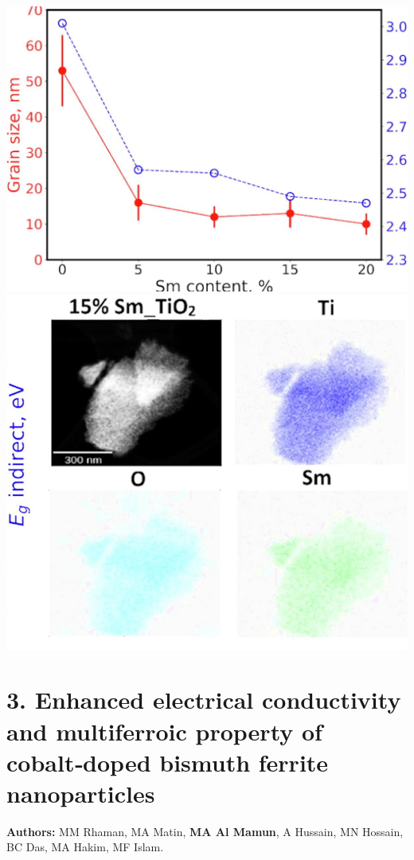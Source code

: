 \documentclass[a4paper,20pt]{article}
\begin{document}
    \begin{minipage}{0.4\linewidth}\begin{flushright}
    	 	\includegraphics[width=0.80\linewidth]{AppSurf1}\\
    	 	\includegraphics[width=0.8\linewidth]{AppSurf2}
    	\end{flushright}\end{minipage}
    	 
\section{\textbf{3. Enhanced electrical conductivity and multiferroic property of cobalt‑doped bismuth ferrite nanoparticles}}

\textbf{Authors:} MM Rhaman, MA Matin, \textbf{MA Al Mamun}, A Hussain, MN Hossain, BC Das, MA Hakim, MF Islam. \\ \vspace{3pt}
\end{document}
